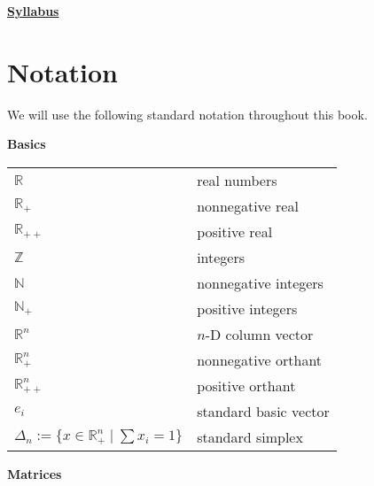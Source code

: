 \documentclass[
]{book}
\theoremstyle{definition}
\theoremstyle{definition}
\theoremstyle{definition}
\theoremstyle{definition}
\theoremstyle{remark}
\begin{document}
\href{https://docs.google.com/document/d/1H6Wqht_PVw_n8Jl0kXN3HjZfHkeZJYqYWT4ayxvqRlU/edit?usp=sharing}{\textbf{Syllabus}}

\hypertarget{notation}{%
\chapter*{Notation}\label{notation}}

We will use the following standard notation throughout this book.

\textbf{Basics}

\begin{longtable}[]{@{}
  >{\raggedright\arraybackslash}p{}
  >{\raggedright\arraybackslash}p{}@{}}
\toprule()
\endhead
\(\mathbb{R}^{}\) & real numbers \\
\(\mathbb{R}^{}_{+}\) & nonnegative real \\
\(\mathbb{R}^{}_{++}\) & positive real \\
\(\mathbb{Z}\) & integers \\
\(\mathbb{N}\) & nonnegative integers \\
\(\mathbb{N}_{+}\) & positive integers \\
\(\mathbb{R}^{n}\) & \(n\)-D column vector \\
\(\mathbb{R}^{n}_{+}\) & nonnegative orthant \\
\(\mathbb{R}^{n}_{++}\) & positive orthant \\
\(e_i\) & standard basic vector \\
\(\Delta_n := \{x \in \mathbb{R}^n_{+} \mid \sum x_i = 1 \}\) & standard simplex \\
\bottomrule()
\end{longtable}

\textbf{Matrices}
\end{document}
